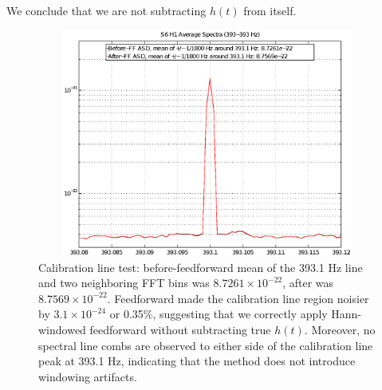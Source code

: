 We conclude that we are not subtracting $h(t)$ from itself.

\begin{figure}
\begin{center}
\includegraphics[height=75mm, width=150mm]{figure6.eps}
\caption{Calibration line test: before-feedforward mean of the 393.1 Hz line and two neighboring FFT bins was $8.7261 \times 10^{-22}$, after was $8.7569 \times 10^{-22}$. Feedforward made the calibration line region noisier by $3.1 \times 10^{-24}$ or 0.35\%, suggesting that we correctly apply Hann-windowed feedforward without subtracting true $h(t)$. Moreover, no spectral line combs are observed to either side of the calibration line peak at 393.1 Hz, indicating that the method does not introduce windowing artifacts.}
\label{calLineTest}
\end{center}
\end{figure}

